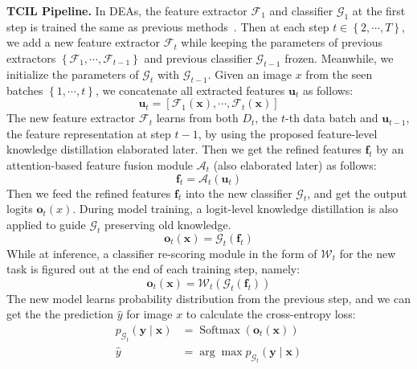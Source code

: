 \documentclass[letterpaper]{article} %
\begin{document}
\textbf{TCIL Pipeline.}
In DEAs, the feature extractor $\mathcal{F}_{1}$ and classifier $\mathcal{G}_{1}$ at the first step is trained the same as previous methods~\cite{p24, e2, w20, t54}. Then at each step $t \in \left\{2, \cdots, T\right\}$, we add a new feature extractor $\mathcal{F}_{t}$ while keeping the parameters of previous extractors $\left\{\mathcal{F}_{1}, \cdots, \mathcal{F}_{t-1}\right\}$ and previous classifier $\mathcal{G}_{t-1}$ frozen. Meanwhile, we initialize the parameters of $\mathcal{G}_{t}$ with $\mathcal{G}_{t-1}$. Given an image $x$ from the seen batches $\left\{1, \cdots, t\right\}$, we concatenate all extracted features $\boldsymbol{u}_{t}$ as follows:
\begin{equation}
\boldsymbol{u}_{t}
=\left[\mathcal{F}_{1}(\boldsymbol{x}), \cdots, \mathcal{F}_{t}(\boldsymbol{x})\right]
\label{e1}
\end{equation}
The new feature extractor $\mathcal{F}_{t}$ learns from both ${D}_{t}$, the $t$-th data batch and $\boldsymbol{u}_{t-1}$, the feature representation at step $t-1$, by using the proposed feature-level knowledge distillation elaborated later. Then we get the refined features $\boldsymbol{f}_{t}$  by an attention-based feature fusion module $\mathcal{A}_t$ (also elaborated later) as follows:
\begin{equation}
\boldsymbol{f}_{t}=\mathcal{A}_t(\boldsymbol{u}_{t})
\label{e2}
\end{equation}
Then we feed the refined features $\boldsymbol{f}_{t}$ into the new classifier $\mathcal{G}_{t}$, and get the output logits $\boldsymbol{o}_{t}(x)$. During model training, a logit-level knowledge distillation is also applied to guide $\mathcal{G}_{t}$ preserving old knowledge.
\begin{equation}
\boldsymbol{o}_{t}(\boldsymbol{x})=\mathcal{G}_{t}(\boldsymbol{f}_{t})
\label{e3}
\end{equation}
While at inference, a classifier re-scoring module in the form of $\mathcal{W}_{t}$ for the new task is figured out at the end of each training step, namely:
\begin{equation}
\boldsymbol{o}_{t}(\boldsymbol{x})=\mathcal{W}_{t}\left(\mathcal{G}_{t}(\boldsymbol{f}_{t})\right)
\label{e32}
\end{equation}
The new model learns probability distribution from the previous step, and we can get the the prediction $\hat{y}$ for image $x$ to calculate the cross-entropy loss:
\begin{equation}
\begin{aligned}
p_{\mathcal{G}_{t}}(\boldsymbol{y} \mid \boldsymbol{x})&=\operatorname{Softmax}\left(\boldsymbol{o}_{t}(\boldsymbol{x})\right) \\
\hat{y}&=\arg \max p_{\mathcal{G}_{t}}(\boldsymbol{y} \mid \boldsymbol{x})
\label{e4}
\end{aligned}
\end{equation}
\end{document}
